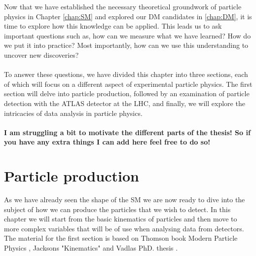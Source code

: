 \documentclass[12pt, a4paper]{book}
\begin{document}
\graphicspath{{../../figures/}}

Now that we have established the necessary theoretical groundwork of particle physics in Chapter \ref{chap:SM} and explored our DM candidates in \ref{chap:DM}, it is time to explore how this knowledge can be applied. This leads us to ask important questions such as, 
how can we measure what we have learned? How do we put it into practice? Most importantly, how can we use this understanding to uncover new discoveries?\\
\\To answer these questions, we have divided this chapter into three sections, each of which will focus on a different aspect of experimental particle physics. The first section will delve into particle production, 
followed by an examination of particle detection with the ATLAS detector at the LHC, and finally, we will explore the intricacies of data analysis in particle physics.\\
\\\textbf{I am struggling a bit to motivate the different parts of the thesis! So if you have any extra things I can add here feel free to do so!}

\clearpage
\section{Particle production}
As we have already seen the shape of the SM we are now ready to dive into the subject of how we can produce the particles that we wish to detect. In this chapter we will start from the basic kinematics of particles 
and then move to more complex variables that will be of use when analysing data from detectors. The material for the first section is based on Thomson book Modern Particle Physics \cite{THOMSON}, Jacksons "Kinematics" \cite{Jackson_kin}
and Vadlas PhD. thesis \cite{KNUT_VADLA}.
\end{document}
